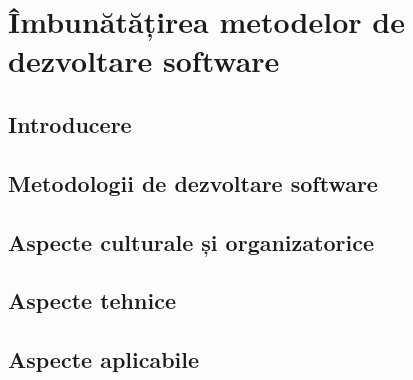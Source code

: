 \chapter{Îmbunătățirea metodelor de dezvoltare software}
\section{Introducere}

\section{Metodologii de dezvoltare software}

\section{Aspecte culturale și organizatorice}

\section{Aspecte tehnice}
\section{Aspecte aplicabile}